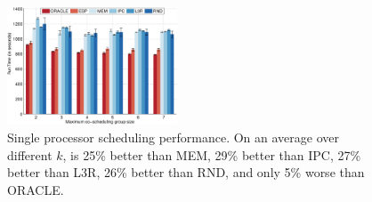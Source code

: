 \begin{figure}[t!]
\begin{center}
 \includegraphics[width=0.45\textwidth]{figures/barmainCOPY.pdf}
 \caption{\small Single processor scheduling performance. On an
   average over different $k$, \SYSTEM{} is 25\% better than MEM, 29\%
   better than IPC, 27\% better than L3R, 26\% better than RND, and
   only 5\% worse than ORACLE. }
\label{fig:bar_single_processor}
\end{center}
\end{figure}


